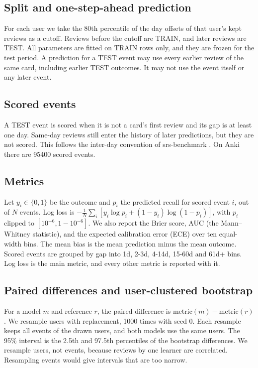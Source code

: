 \subsection{Split and one-step-ahead prediction}
For each user we take the 80th percentile of the day offsets of that user's kept reviews as a cutoff.
Reviews before the cutoff are TRAIN, and later reviews are TEST.
All parameters are fitted on TRAIN rows only, and they are frozen for the test period.
A prediction for a TEST event may use every earlier review of the same card, including earlier TEST outcomes.
It may not use the event itself or any later event.

\subsection{Scored events}
A TEST event is scored when it is not a card's first review and its gap is at least one day.
Same-day reviews still enter the history of later predictions, but they are not scored.
This follows the inter-day convention of srs-benchmark \cite{srsbenchmark}.
On Anki there are 95400 scored events.

\subsection{Metrics}
Let $y_i \in \{0,1\}$ be the outcome and $p_i$ the predicted recall for scored event $i$, out of $N$ events.
Log loss is $-\frac{1}{N}\sum_i [y_i \log p_i + (1-y_i)\log(1-p_i)]$, with $p_i$ clipped to $[10^{-6}, 1-10^{-6}]$.
We also report the Brier score, AUC (the Mann--Whitney statistic), and the expected calibration error (ECE) over ten equal-width bins.
The mean bias is the mean prediction minus the mean outcome.
Scored events are grouped by gap into 1d, 2-3d, 4-14d, 15-60d and 61d+ bins.
Log loss is the main metric, and every other metric is reported with it.

\subsection{Paired differences and user-clustered bootstrap}
For a model $m$ and reference $r$, the paired difference is $\mathrm{metric}(m) - \mathrm{metric}(r)$.
We resample users with replacement, 1000 times with seed 0.
Each resample keeps all events of the drawn users, and both models use the same users.
The 95\% interval is the 2.5th and 97.5th percentiles of the bootstrap differences.
We resample users, not events, because reviews by one learner are correlated.
Resampling events would give intervals that are too narrow.

